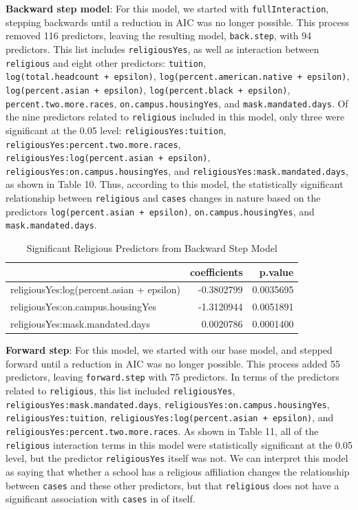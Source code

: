 \documentclass[
]{article}
\begin{document}
\textbf{Backward step model}: For this model, we started with
\texttt{fullInteraction}, stepping backwards until a reduction in AIC
was no longer possible. This process removed 116 predictors, leaving the
resulting model, \texttt{back.step}, with 94 predictors. This list
includes \texttt{religiousYes}, as well as interaction between
\texttt{religious} and eight other predictors: \texttt{tuition},
\texttt{log(total.headcount\ +\ epsilon)},
\texttt{log(percent.american.native\ +\ epsilon)},
\texttt{log(percent.asian\ +\ epsilon)},
\texttt{log(percent.black\ +\ epsilon)},
\texttt{percent.two.more.races}, \texttt{on.campus.housingYes}, and
\texttt{mask.mandated.days}. Of the nine predictors related to
\texttt{religious} included in this model, only three were significant
at the 0.05 level: \texttt{religiousYes:tuition},
\texttt{religiousYes:percent.two.more.races},
\texttt{religiousYes:log(percent.asian\ +\ epsilon)},
\texttt{religiousYes:on.campus.housingYes}, and
\texttt{religiousYes:mask.mandated.days}, as shown in Table 10. Thus,
according to this model, the statistically significant relationship
between \texttt{religious} and \texttt{cases} changes in nature based on
the predictors \texttt{log(percent.asian\ +\ epsilon)},
\texttt{on.campus.housingYes}, and \texttt{mask.mandated.days}.

\begin{table}

\caption{\label{tab:unnamed-chunk-24}Significant Religious Predictors from Backward Step Model}
\centering
\begin{tabular}[t]{l|r|r}
\hline
  & coefficients & p.value\\
\hline
religiousYes:log(percent.asian + epsilon) & -0.3802799 & 0.0035695\\
\hline
religiousYes:on.campus.housingYes & -1.3120944 & 0.0051891\\
\hline
religiousYes:mask.mandated.days & 0.0020786 & 0.0001400\\
\hline
\end{tabular}
\end{table}

\textbf{Forward step}: For this model, we started with our base model,
and stepped forward until a reduction in AIC was no longer possible.
This process added 55 predictors, leaving \texttt{forward.step} with 75
predictors. In terms of the predictors related to \texttt{religious},
this list included \texttt{religiousYes},
\texttt{religiousYes:mask.mandated.days},
\texttt{religiousYes:on.campus.housingYes},
\texttt{religiousYes:tuition},
\texttt{religiousYes:log(percent.asian\ +\ epsilon)}, and
\texttt{religiousYes:percent.two.more.races}. As shown in Table 11, all
of the \texttt{religious} interaction terms in this model were
statistically significant at the 0.05 level, but the predictor
\texttt{religiousYes} itself was not. We can interpret this model as
saying that whether a school has a religious affiliation changes the
relationship between \texttt{cases} and these other predictors, but that
\texttt{religious} does not have a significant association with
\texttt{cases} in of itself.
\end{document}
